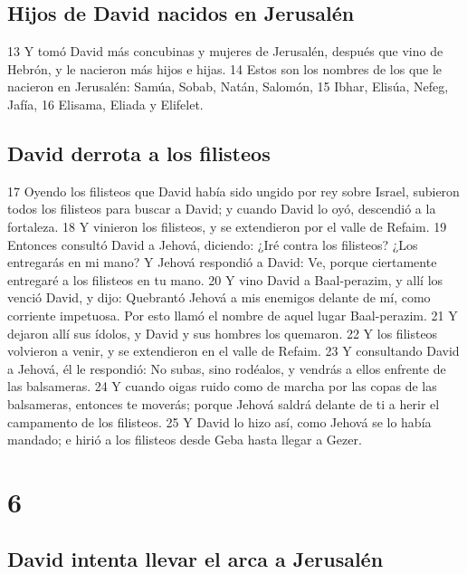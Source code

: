\section*{Hijos de David nacidos en Jerusalén }

13 Y tomó David más concubinas y mujeres de Jerusalén, después que vino de Hebrón, y le nacieron más hijos e hijas.
14 Estos son los nombres de los que le nacieron en Jerusalén: Samúa, Sobab, Natán, Salomón,
15 Ibhar, Elisúa, Nefeg, Jafía,
16 Elisama, Eliada y Elifelet.
\section*{David derrota a los filisteos}

 
17 Oyendo los filisteos que David había sido ungido por rey sobre Israel, subieron todos los filisteos para buscar a David; y cuando David lo oyó, descendió a la fortaleza.
18 Y vinieron los filisteos, y se extendieron por el valle de Refaim.
19 Entonces consultó David a Jehová, diciendo: ¿Iré contra los filisteos? ¿Los entregarás en mi mano? Y Jehová respondió a David: Ve, porque ciertamente entregaré a los filisteos en tu mano.
20 Y vino David a Baal-perazim, y allí los venció David, y dijo: Quebrantó Jehová a mis enemigos delante de mí, como corriente impetuosa. Por esto llamó el nombre de aquel lugar Baal-perazim.
21 Y dejaron allí sus ídolos, y David y sus hombres los quemaron.
22 Y los filisteos volvieron a venir, y se extendieron en el valle de Refaim.
23 Y consultando David a Jehová, él le respondió: No subas, sino rodéalos, y vendrás a ellos enfrente de las balsameras.
24 Y cuando oigas ruido como de marcha por las copas de las balsameras, entonces te moverás; porque Jehová saldrá delante de ti a herir el campamento de los filisteos.
25 Y David lo hizo así, como Jehová se lo había mandado; e hirió a los filisteos desde Geba hasta llegar a Gezer.

\chapter{6}

\section*{David intenta llevar el arca a Jerusalén}

 

